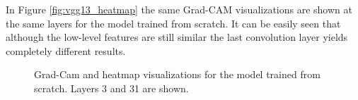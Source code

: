 In Figure \ref{fig:vgg13_heatmap} the same Grad-CAM visualizations are shown at the same layers for the model trained from scratch. It can be easily seen that although the low-level features are still similar the last convolution layer yields completely different results.

\begin{figure}[H]
\centering
\caption{Grad-Cam and heatmap visualizations for the model trained from scratch. Layers 3 and 31 are shown.}



\end{figure}
